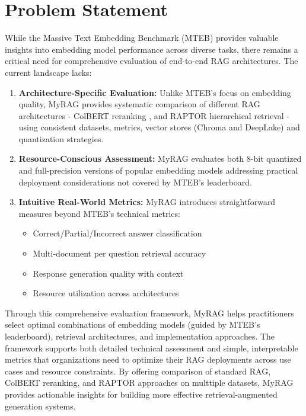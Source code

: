 \documentclass{scrartcl}
\begin{document}
\section{Problem Statement}

While the Massive Text Embedding Benchmark (MTEB) \cite{muennighoff2022mteb} provides valuable insights into embedding model performance across diverse tasks, there remains a critical need for comprehensive evaluation of end-to-end RAG architectures. The current landscape lacks:

\begin{enumerate}
    \item \textbf{Architecture-Specific Evaluation:} Unlike MTEB's focus on embedding quality, MyRAG provides systematic comparison of different RAG architectures - ColBERT reranking \cite{khattab2020colbert}, and RAPTOR hierarchical retrieval \cite{wu2021recursively, raptor2024} - using consistent datasets, metrics, vector stores (Chroma and DeepLake) and quantization strategies.
    
    \item \textbf{Resource-Conscious Assessment:} MyRAG evaluates both 8-bit quantized and full-precision versions of popular embedding models addressing practical deployment considerations not covered by MTEB's leaderboard.
    
    \item \textbf{Intuitive Real-World Metrics:} MyRAG introduces straightforward measures beyond MTEB's technical metrics:
    \begin{itemize}
        \item Correct/Partial/Incorrect answer classification
        \item Multi-document per question retrieval accuracy 
        \item Response generation quality with context
        \item Resource utilization across architectures
    \end{itemize}
\end{enumerate}

Through this comprehensive evaluation framework, MyRAG helps practitioners select optimal combinations of embedding models (guided by MTEB's leaderboard), retrieval architectures, and implementation approaches. The framework supports both detailed technical assessment and simple, interpretable metrics that organizations need to optimize their RAG deployments across use cases and resource constraints. By offering comparison of standard RAG, ColBERT reranking, and RAPTOR approaches on multtiple datasets, MyRAG provides actionable insights for building more effective retrieval-augmented generation systems.
\end{document}
